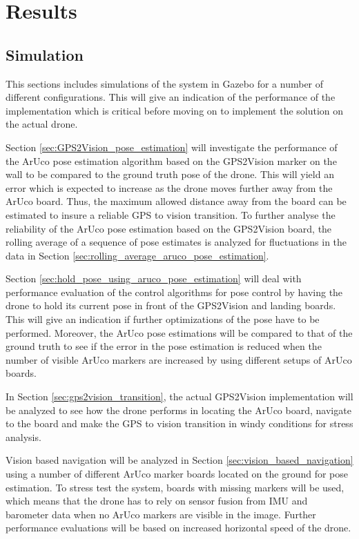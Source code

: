\documentclass[../Head/report.tex]{subfiles}
\begin{document}
\section{Results}
\label{sec:results}

\subsection{Simulation}

This sections includes simulations of the system in Gazebo for a number of different configurations. This will give an indication of the performance of the implementation which is critical before moving on to implement the solution on the actual drone. 

Section \ref{sec:GPS2Vision_pose_estimation} will investigate the performance of the ArUco pose estimation algorithm based on the GPS2Vision marker on the wall to be compared to the ground truth pose of the drone. This will yield an error which is expected to increase as the drone moves further away from the ArUco board. Thus, the maximum allowed distance away from the board can be estimated to insure a reliable GPS to vision transition. To further analyse the reliability of the ArUco pose estimation based on the GPS2Vision board, the rolling average of a sequence of pose estimates is analyzed for fluctuations in the data in Section \ref{sec:rolling_average_aruco_pose_estimation}. 

Section \ref{sec:hold_pose_using_aruco_pose_estimation} will deal with performance evaluation of the control algorithms for pose control by having the drone to hold its current pose in front of the GPS2Vision and landing boards. This will give an indication if further optimizations of the pose have to be performed. Moreover, the ArUco pose estimations will be compared to that of the ground truth to see if the error in the pose estimation is reduced when the number of visible ArUco markers are increased by using different setups of ArUco boards. 

In Section \ref{sec:gps2vision_transition}, the actual GPS2Vision implementation will be analyzed to see how the drone performs in locating the ArUco board, navigate to the board and make the GPS to vision transition in windy conditions for stress analysis. 

Vision based navigation will be analyzed in Section \ref{sec:vision_based_navigation} using a number of different ArUco marker boards located on the ground for pose estimation. To stress test the system, boards with missing markers will be used, which means that the drone has to rely on sensor fusion from IMU and barometer data when no ArUco markers are visible in the image. Further performance evaluations will be based on increased horizontal speed of the drone. 
\end{document}
